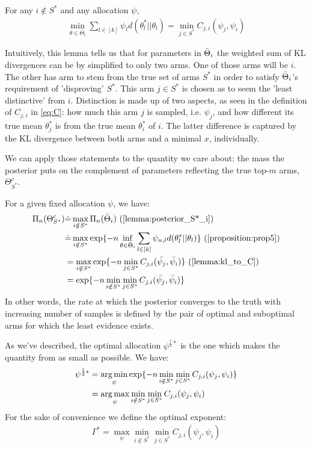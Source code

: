 \begin{lemma}\label{lemma:kl_to_C}
  For any $i \notin S^*$ and any allocation $\psi$,
  \begin{align}
    \min_{\theta \in \bar{\Theta}_i} \sum_{l \in [k]}\psi_l
        d(\theta^*_l||\theta_l) = \min_{j \in S^*} C_{j, i}(\psi_j, \psi_i)
  \end{align}
\end{lemma}

Intuitively, this lemma tells us that for parameters in $\Bar{\Theta}_i$ the
weighted sum of KL divergences can be by simplified to only two arms. One of
those arms will be $i$. The other has arm to stem from the true set of arms
$S^*$ in order to satisfy $\Bar{\Theta}_i$'s requirement of 'disproving' $S^*$.
This arm $j \in S^*$ is chosen as to seem the 'least distinctive' from $i$.
Distinction is made up of two aspects, as seen in the definition of $C_{j, i}$
in \eqref{eq:C}: how much this arm $j$ is sampled, i.e. $\psi_j$, and how
different its true mean $\theta^*_j$ is from the true mean $\theta^*_i$ of $i$.
The latter difference is captured by the KL divergence between both arms and a
minimal $x$, individually.

We can apply those statements to the quantity we care about: the mass the
posterior puts on the complement of parameters reflecting the true top-$m$ arms,
$\Theta_{S^*}^c$.

For a given fixed allocation $\psi$, we have:
\begin{align}
  \Pi_n(\Theta_{S^*}^c) &\deq \max_{i \notin S^*}\Pi_n(\bar{\Theta}_i) \text{ (\Cref{lemma:posterior_S*_i})}\\
    &\deq \max_{i \notin S^*} \exp\{-n\inf_{\theta \in \bar{\Theta}_i} \sum_{l
        \in [k]} \psi_{n, l} d(\theta^*_l || \theta_l)\} \text{
        (\Cref{proposition:prop5})} \\
    &= \max_{i \notin S^*} \exp\{-n \min_{j \in S^*} C_{j, i}(\bar{\psi_j},
        \bar{\psi_i})\} \text{ (\Cref{lemma:kl_to_C})} \\
    &= \exp\{-n \min_{i \notin S^*}\min_{j \in S^*} C_{j, i}(\bar{\psi_j},
        \bar{\psi_i})\} \label{eq:posterior}
\end{align}
In other words, the rate at which the posterior converges to the truth with
increasing number of samples is defined by the pair of optimal and suboptimal
arms for which the least evidence exists.

As we've described, the optimal allocation $\psi^{\frac{1}{2}*}$ is the one
which makes the quantity from  as small as possible. We have:
\begin{align}
  \psi^{\frac{1}{2}*} &= \operatorname*{arg\,min}_{\psi} \exp\{-n \min_{i \notin S^*}\min_{j \in
      S^*} C_{j, i}(\psi_j, \psi_i)\} \\
    &= \operatorname*{arg\,max}_{\psi} \min_{i \notin S^*}\min_{j \in S^*} C_{j, i}(\psi_j,
        \psi_i) \label{eq:psi^*}
\end{align}
For the sake of convenience we define the optimal exponent:
\begin{align}
  \Gamma^* = \max_{\psi} \min_{i \notin S^*}\min_{j \in S^*} C_{j, i}(\psi_j,
      \psi_i) \label{eq:gamma^*}
\end{align}

